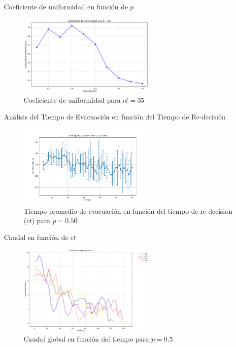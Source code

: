 \documentclass[aspectratio=169]{beamer}
\begin{document}
\begin{frame}{Coeficiente de uniformidad en función de $p$}
    \begin{figure}[H]
        \centering
        \includegraphics[width=0.6\textwidth]{img/uniformity_vs_p_t35.png}
        \caption{Coeficiente de uniformidad para $ct=35$}
        \label{fig:flow_p100}
    \end{figure}
\end{frame}

\begin{frame}{Análisis del Tiempo de Evacuación en función del Tiempo de Re-decisión}
    \begin{figure}[H]
        \centering
        \includegraphics[width=0.6\textwidth]{img/evacuation_times_p_0.5.png}
        \caption{Tiempo promedio de evacuación en función del tiempo de re-decisión ($ct$) para $p=0.50$}
        \label{fig:evac_time_ct}
    \end{figure}    
\end{frame}

\begin{frame}{Caudal en función de $ct$}
    \begin{figure}[H]
        \centering
        \includegraphics[width=0.6\textwidth]{img/flow_rates_p0.5.png}
        \caption{Caudal global en función del tiempo para $p=0.5$}
        \label{fig:flow_p100}
    \end{figure}    
\end{frame}
\end{document}
